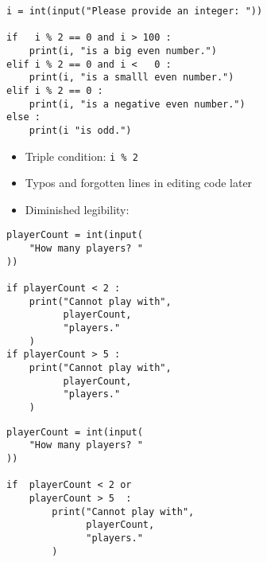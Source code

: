 \begin{frame}[fragile]
%
\begin{warnbox}[Redundancy with \texttt{if} and Logical Operators: \texttt{elif}, leftupper=6mm]
\begin{verbatim}
i = int(input("Please provide an integer: "))

if   i % 2 == 0 and i > 100 :
    print(i, "is a big even number.")
elif i % 2 == 0 and i <   0 :
    print(i, "is a smalll even number.")
elif i % 2 == 0 :
    print(i, "is a negative even number.")
else :
    print(i "is odd.")
\end{verbatim}
\end{warnbox}
%
\begin{itemize}
\item Triple condition: \texttt{i \% 2}
\item Typos and forgotten lines in editing code later
\item Diminished legibility: 
\end{itemize}
%
\end{frame}


\begin{frame}[fragile]
%
\begin{tcbraster}[raster columns=2,
                  raster equal height,
                  nobeforeafter,
                  raster column skip=0.5cm]
	\begin{warnbox}[Validity Check: Sequence of \texttt{if}s, leftupper=7mm]
	\begin{verbatim}
playerCount = int(input(
    "How many players? "
))
      
if playerCount < 2 :
    print("Cannot play with", 
          playerCount, 
          "players."
    )
if playerCount > 5 :
    print("Cannot play with", 
          playerCount,
          "players."
    )
	\end{verbatim}
	\end{warnbox}
%
	\begin{codebox}
	\begin{verbatim}
playerCount = int(input(
    "How many players? "
))
      
if  playerCount < 2 or
    playerCount > 5  :
        print("Cannot play with",
              playerCount,
              "players."
        )
	\end{verbatim}
	\end{codebox}
\end{tcbraster}
%
\end{frame}

